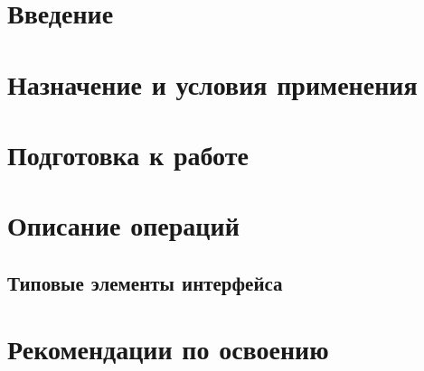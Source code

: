 \documentclass[a4paper,11pt]{report}
\begin{document}
	

\tableofcontents
\clearpage

\chapter{Введение}
	
\chapter{Назначение и условия применения}
	
\chapter{Подготовка к работе}
	
\chapter{Описание операций}
	
	
	
	
	\section{Типовые элементы интерфейса}
		
		
	
	
	
	
	
	
	
	
	
	
  
\chapter{Рекомендации по освоению}
	
	
\end{document}

